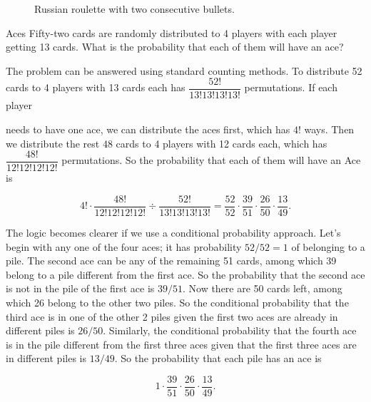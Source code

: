 \begin{figure}[ht]
\centering
{}
\caption{Russian roulette with two consecutive bullets.}
\label{fig:zhou-figure-4-3}
\end{figure}

\begin{problem}{Aces}
Fifty-two cards are randomly distributed to 4 players with each player getting 13 cards.
What is the probability that each of them will have an ace?
\end{problem}

\begin{solution}
The problem can be answered using standard counting methods. To distribute
52 cards to 4 players with 13 cards each has $\dfrac{52!}{13!13!13!13!}$ permutations. If each player

needs to have one ace, we can distribute the aces first, which has $4!$ ways. Then we
distribute the rest 48 cards to 4 players with 12 cards each, which has
$\dfrac{48!}{12!12!12!12!}$ permutations. So the probability that each of them will have an Ace is

\[
4!\cdot\frac{48!}{12!12!12!12!}\div\frac{52!}{13!13!13!13!}
=\frac{52}{52}\cdot\frac{39}{51}\cdot\frac{26}{50}\cdot\frac{13}{49}.
\]

The logic becomes clearer if we use a conditional probability approach. Let's begin with
any one of the four aces; it has probability $52/52=1$ of belonging to a pile. The second
ace can be any of the remaining 51 cards, among which 39 belong to a pile different
from the first ace. So the probability that the second ace is not in the pile of the first ace
is $39/51$. Now there are 50 cards left, among which 26 belong to the other two piles. So
the conditional probability that the third ace is in one of the other 2 piles given the first
two aces are already in different piles is $26/50$. Similarly, the conditional probability
that the fourth ace is in the pile different from the first three aces given that the first
three aces are in different piles is $13/49$. So the probability that each pile has an ace is

\[
1\cdot\frac{39}{51}\cdot\frac{26}{50}\cdot\frac{13}{49}.
\]

\end{solution}

